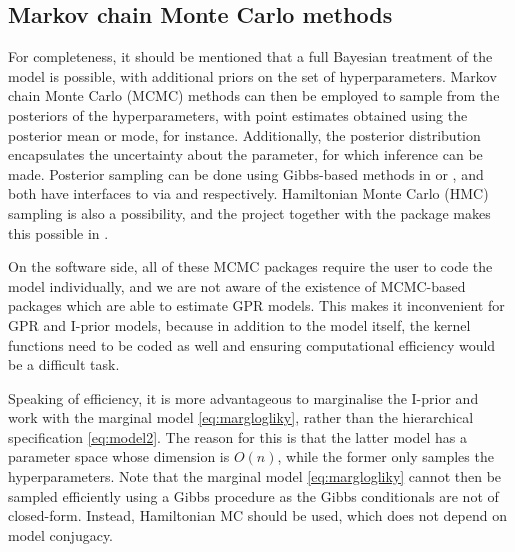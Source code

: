 

\subsection{Markov chain Monte Carlo methods}

For completeness, it should be mentioned that a full Bayesian treatment of the model is possible, with additional priors on the set of hyperparameters.
Markov chain Monte Carlo (MCMC) methods can then be employed to sample from the posteriors of the hyperparameters, with point estimates obtained using the posterior mean or mode, for instance.
Additionally, the posterior distribution encapsulates the uncertainty about the parameter, for which inference can be made.
Posterior sampling can be done using Gibbs-based methods in  \citep{lunn2000winbugs} or  \citep{plummer2003jags}, and both have interfaces to  via  \citep{sturtz2005r2winbugs} and  \citep{denwood2016runjags} respectively.
Hamiltonian Monte Carlo (HMC) sampling is also a possibility, and the  project \citep{carpenter2016stan} together with the package  \citep{rstan}  makes this possible in .

On the software side, all of these MCMC packages require the user to code the model individually, and we are not aware of the existence of MCMC-based packages which are able to estimate GPR models.
This makes it inconvenient for GPR and I-prior models, because in addition to the model itself, the kernel functions need to be coded as well and ensuring computational efficiency would be a difficult task.

Speaking of efficiency, it is more advantageous to marginalise the I-prior and work with the marginal model \cref{eq:marglogliky}, rather than the hierarchical specification \cref{eq:model2}.
The reason for this is that the latter model has a parameter space whose dimension is $O(n)$, while the former only samples the hyperparameters.
Note that the marginal model \cref{eq:marglogliky} cannot then be sampled efficiently using a Gibbs procedure as the Gibbs conditionals are not of closed-form.
Instead, Hamiltonian MC should be used, which does not depend on model conjugacy.

